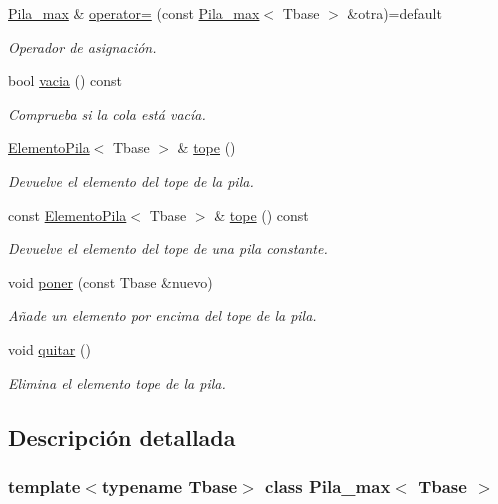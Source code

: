\begin{DoxyCompactItemize}
\hyperlink{classPila__max}{Pila\+\_\+max} \& \hyperlink{classPila__max_a9dd8b206b245be51149a2100a83529c7}{operator=} (const \hyperlink{classPila__max}{Pila\+\_\+max}$<$ Tbase $>$ \&otra)=default
\begin{DoxyCompactList}\small\item\em Operador de asignación. \end{DoxyCompactList}\item 
bool \hyperlink{classPila__max_aa61d11b7ee3e037dea632d185ca146a0}{vacia} () const
\begin{DoxyCompactList}\small\item\em Comprueba si la cola está vacía. \end{DoxyCompactList}\item 
\hyperlink{structElementoPila}{Elemento\+Pila}$<$ Tbase $>$ \& \hyperlink{classPila__max_a7d89c4740df471a1d6d0a41f9308406f}{tope} ()
\begin{DoxyCompactList}\small\item\em Devuelve el elemento del tope de la pila. \end{DoxyCompactList}\item 
const \hyperlink{structElementoPila}{Elemento\+Pila}$<$ Tbase $>$ \& \hyperlink{classPila__max_a675ce3ae969e6a9050b0b8289b9d4934}{tope} () const
\begin{DoxyCompactList}\small\item\em Devuelve el elemento del tope de una pila constante. \end{DoxyCompactList}\item 
void \hyperlink{classPila__max_a08e06bab9c6269a0906b6ff47a533088}{poner} (const Tbase \&nuevo)
\begin{DoxyCompactList}\small\item\em Añade un elemento por encima del tope de la pila. \end{DoxyCompactList}\item 
void \hyperlink{classPila__max_a362d8228e46eff38e2d5827a4726b9e9}{quitar} ()
\begin{DoxyCompactList}\small\item\em Elimina el elemento tope de la pila. \end{DoxyCompactList}\end{DoxyCompactItemize}


\subsection{Descripción detallada}
\subsubsection*{template$<$typename Tbase$>$\newline
class Pila\+\_\+max$<$ Tbase $>$}

